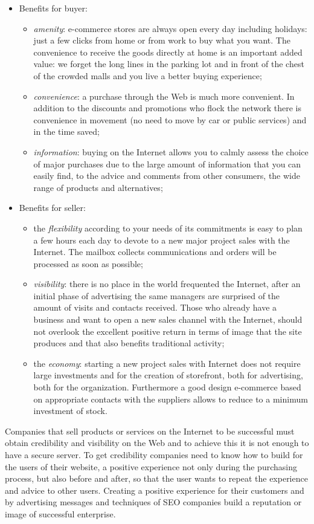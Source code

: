 \begin{itemize}
  \item Benefits for buyer:
  \begin{itemize}
    \item \emph{amenity}: e-commerce stores are always open every day including holidays: just a few clicks from home or from work to buy what you want. The convenience to receive the goods directly at home is an important added value: we forget the long lines in the parking lot and in front of the chest of the crowded malls and you live a better buying experience;
    \item \emph{convenience}: a purchase through the Web is much more convenient. In addition to the discounts and promotions who flock the network there is convenience in movement (no need to move by car or public services) and in the time saved;
    \item \emph{information}: buying on the Internet allows you to calmly assess the choice of major purchases due to the large amount of information that you can easily find, to the advice and comments from other consumers, the wide range of products and alternatives;
  \end{itemize}
  \item Benefits for seller:
    \begin{itemize}
    \item the \emph{flexibility} according to your needs of its commitments is easy to plan a few hours each day to devote to a new major project sales with the Internet. The mailbox collects communications and orders will be processed as soon as possible;
    \item \emph{visibility}: there is no place in the world frequented the Internet, after an initial phase of advertising the same managers are surprised of the amount of visits and contacts received. Those who already have a business and want to open a new sales channel with the Internet, should not overlook the excellent positive return in terms of image that the site produces and that also benefits traditional activity;
    \item the \emph{economy}: starting a new project sales with Internet does not require large investments and for the creation of storefront, both for advertising, both for the organization. Furthermore a good design e-commerce based on appropriate contacts with the suppliers allows to reduce to a minimum investment of stock.
  \end{itemize}
\end{itemize}
Companies that sell products or services on the Internet to be successful must obtain credibility and visibility on the Web and to achieve this it is not enough to have a secure server. To get credibility companies need to know how to build for the users of their website, a positive experience not only during the purchasing process, but also before and after, so that the user wants to repeat the experience and advice to other users. Creating a positive experience for their customers and by advertising messages and techniques of SEO companies build a reputation or image of successful enterprise.
